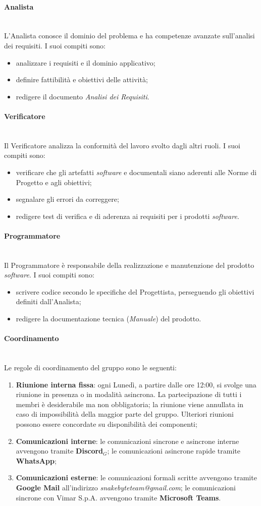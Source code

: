 \documentclass[10pt, letterpaper]{article}
\newcommand{\trisubsection}[1]{\paragraph{#1}\mbox{}\\}
\begin{document}
\label{sec:Analista}
\trisubsection{Analista}
L'Analista conosce il dominio del problema e ha competenze avanzate sull'analisi dei requisiti. I suoi compiti sono:
\begin{itemize}
    \item analizzare i requisiti e il dominio applicativo;
    \item definire fattibilità e obiettivi delle attività;
    \item redigere il documento \textit{Analisi dei Requisiti}.
\end{itemize}

\label{sec:Verificatore}
\trisubsection{Verificatore}
Il Verificatore analizza la conformità del lavoro svolto dagli altri ruoli. I suoi compiti sono:
\begin{itemize}
    \item verificare che gli artefatti \textit{software} e documentali siano aderenti alle Norme di Progetto e agli obiettivi;
    \item segnalare gli errori da correggere;
    \item redigere test di verifica e di aderenza ai requisiti per i prodotti \textit{software}.
\end{itemize}

\label{sec:Programmatore}
\trisubsection{Programmatore}
Il Programmatore è responsabile della realizzazione e manutenzione del prodotto \textit{software}. I suoi compiti sono:
\begin{itemize}
    \item scrivere codice secondo le specifiche del Progettista, perseguendo gli obiettivi definiti dall'Analista;
    \item redigere la documentazione tecnica (\textit{Manuale}) del prodotto.
\end{itemize}

\trisubsection{Coordinamento}
Le regole di coordinamento del gruppo sono le seguenti:
\begin{enumerate}
    \item \textbf{Riunione interna fissa}: ogni Lunedì, a partire dalle ore 12:00, si svolge una riunione in presenza o in modalità asincrona. La partecipazione di tutti i membri è desiderabile ma non obbligatoria; la riunione viene annullata in caso di impossibilità della maggior parte del gruppo. Ulteriori riunioni possono essere concordate su disponibilità dei componenti;
    \item \textbf{Comunicazioni interne}: le comunicazioni sincrone e asincrone interne avvengono tramite \textbf{Discord}$_{G}$; le comunicazioni asincrone rapide tramite \textbf{WhatsApp};
    \item \textbf{Comunicazioni esterne}: le comunicazioni formali scritte avvengono tramite \textbf{Google Mail} all'indirizzo \textit{snakebyteteam@gmail.com}; le comunicazioni sincrone con Vimar S.p.A. avvengono tramite \textbf{Microsoft Teams}.
\end{enumerate}
\end{document}
